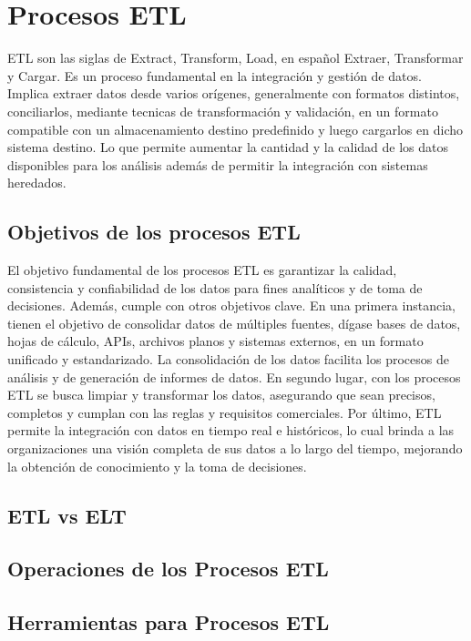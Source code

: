 \section{Procesos ETL}\label{section:etl}

ETL son las siglas de  Extract, Transform, Load, en español Extraer, Transformar y Cargar. Es un proceso fundamental en la 
integración y gestión de datos. Implica extraer datos desde varios or\'igenes, generalmente con formatos distintos, 
conciliarlos, mediante tecnicas de transformación y validaci\'on, en un formato compatible con un almacenamiento destino 
predefinido y luego cargarlos en dicho sistema destino. Lo que permite aumentar la cantidad y la calidad de los datos 
disponibles para los an\'alisis adem\'as de permitir la integración con sistemas heredados.

\subsection{Objetivos de los procesos ETL}

El objetivo fundamental de los procesos ETL es garantizar la calidad, consistencia y confiabilidad de los datos para 
fines anal\'iticos y de toma de decisiones. Adem\'as, cumple con otros objetivos clave. En una primera instancia, 
tienen el objetivo de consolidar datos de m\'ultiples fuentes, d\'igase bases de datos, hojas de c\'alculo, APIs, 
archivos planos y sistemas externos, en un formato unificado y estandarizado. La consolidación de los datos facilita 
los procesos de an\'alisis y de generación de informes de datos. En segundo lugar, con los procesos ETL se busca 
limpiar y transformar los datos, asegurando que sean precisos, completos y cumplan con las reglas y requisitos comerciales. 
Por \'ultimo, ETL permite la integración con datos en tiempo real e históricos, lo cual brinda a las organizaciones una visión 
completa de sus datos a lo largo del tiempo, mejorando la obtenci\'on de conocimiento y la toma de decisiones.

\subsection{ETL vs ELT}
\subsection{Operaciones de los Procesos ETL}
\subsection{Herramientas para Procesos ETL}
